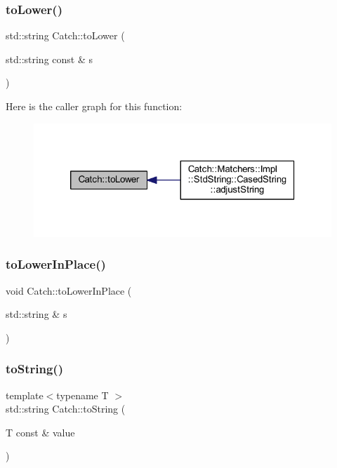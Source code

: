 \subsubsection{\texorpdfstring{to\+Lower()}{toLower()}}
{\footnotesize\ttfamily std\+::string Catch\+::to\+Lower (\begin{DoxyParamCaption}\item[{std\+::string const \&}]{s }\end{DoxyParamCaption})}

Here is the caller graph for this function\+:\nopagebreak
\begin{figure}[H]
\begin{center}
\leavevmode
\includegraphics[width=320pt]{namespace_catch_ac036a17412d318598ffda8e1fe7a1177_icgraph}
\end{center}
\end{figure}
\hypertarget{namespace_catch_a0760dbe87d090a55a35414db57d272c4}{}\label{namespace_catch_a0760dbe87d090a55a35414db57d272c4} 
\subsubsection{\texorpdfstring{to\+Lower\+In\+Place()}{toLowerInPlace()}}
{\footnotesize\ttfamily void Catch\+::to\+Lower\+In\+Place (\begin{DoxyParamCaption}\item[{std\+::string \&}]{s }\end{DoxyParamCaption})}

\hypertarget{namespace_catch_adbd1730f961da94d9ed284f70fd7a28b}{}\label{namespace_catch_adbd1730f961da94d9ed284f70fd7a28b} 
\subsubsection{\texorpdfstring{to\+String()}{toString()}\hspace{0.1cm}{\footnotesize\ttfamily [1/17]}}
{\footnotesize\ttfamily template$<$typename T $>$ \\
std\+::string Catch\+::to\+String (\begin{DoxyParamCaption}\item[{T const \&}]{value }\end{DoxyParamCaption})}



